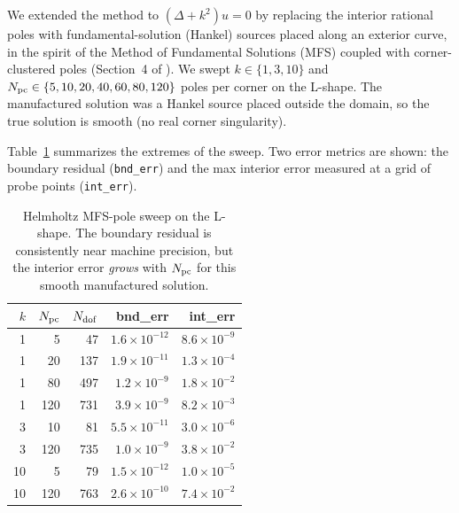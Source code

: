 \documentclass[11pt]{article}
\begin{document}
We extended the method to $(\Delta + k^2)u = 0$ by replacing the interior
rational poles with fundamental-solution (Hankel) sources placed along an
exterior curve, in the spirit of the Method of Fundamental Solutions (MFS)
coupled with corner-clustered poles (Section~4 of \cite{gopal2019}). We swept
$k \in \{1, 3, 10\}$ and $N_{\rm pc} \in \{5,10,20,40,60,80,120\}$ poles per
corner on the L-shape. The manufactured solution was a Hankel source placed
outside the domain, so the true solution is smooth (no real corner
singularity).

Table~\ref{tab:exp4} summarizes the extremes of the sweep. Two error metrics
are shown: the boundary residual (\texttt{bnd\_err}) and the max interior
error measured at a grid of probe points (\texttt{int\_err}).

\begin{table}[h]
\centering
\small
\begin{tabular}{rrrrr}
\toprule
$k$ & $N_{\rm pc}$ & $N_{\rm dof}$ & bnd\_err & int\_err \\
\midrule
 1 &  5  &  47 & $1.6\times 10^{-12}$ & $8.6\times 10^{-9}$ \\
 1 & 20  & 137 & $1.9\times 10^{-11}$ & $1.3\times 10^{-4}$ \\
 1 & 80  & 497 & $1.2\times 10^{-9}$  & $1.8\times 10^{-2}$ \\
 1 & 120 & 731 & $3.9\times 10^{-9}$  & $8.2\times 10^{-3}$ \\
 3 & 10  &  81 & $5.5\times 10^{-11}$ & $3.0\times 10^{-6}$ \\
 3 & 120 & 735 & $1.0\times 10^{-9}$  & $3.8\times 10^{-2}$ \\
10 &  5  &  79 & $1.5\times 10^{-12}$ & $1.0\times 10^{-5}$ \\
10 & 120 & 763 & $2.6\times 10^{-10}$ & $7.4\times 10^{-2}$ \\
\bottomrule
\end{tabular}
\caption{Helmholtz MFS-pole sweep on the L-shape. The boundary residual is
consistently near machine precision, but the interior error \emph{grows} with
$N_{\rm pc}$ for this smooth manufactured solution.}
\label{tab:exp4}
\end{table}
\end{document}
